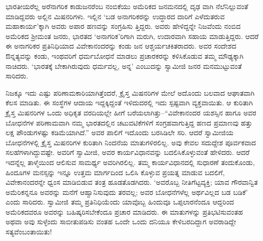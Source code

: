 ಭಾರತೀಯರೆಲ್ಲ ಅರೆನಾಗರಿಕ ಕಾಡುಜನರೆಂಬ ನಂಬಿಕೆಯು ಅಮೆರಿಕದ ಜನಮನದಲ್ಲಿ ದೃಢ ವಾಗಿ ನೆಲೆನಿಲ್ಲುವಂತೆ ಮಾಡಿದ್ದವರು ಅಲ್ಲಿನ ಮಿಷನರಿಗಳು. ಇಲ್ಲಿನ ‘ಬಡ ಅನಾಗರಿಕರನ್ನು ಉದ್ಧಾರದ ದಾರಿಗೆ ಎಳೆದುತರುವ ಮಹಾಕಾರ್ಯ’ಕ್ಕಾಗಿ ಅವರು ಅಪಾರ ಹಣವನ್ನು ಸಂಗ್ರಹಿಸು ತ್ತಿದ್ದರು. ಅವರು ಹೇಳಿದ್ದನ್ನೇ ನಿಜವೆಂದು ನಂಬಿದ ಅಮೆರಿಕದ ಶ್ರೀಮಂತ ಜನರು, ಭಾರತದ ‘ಅನಾಗರಿಕ’ರಿಗಾಗಿ ಮರುಗಿ, ಉದಾರವಾಗಿ ಸಹಾಯ ಮಾಡುತ್ತಿದ್ದರು. ಆದರೆ ಈ ಅನಾಗರಿಕರ ಪ್ರತಿನಿಧಿಯಾದ ವಿವೇಕಾನಂದರನ್ನು ಕಂಡು ಜನ ಆಶ್ಚರ್ಯಚಕಿತರಾದರು. ಅವರ ಸಂದೇಶದ ಔನ್ನತ್ಯವನ್ನು ಕಂಡು, ಇಂಥವರಿಗೆ ಧರ್ಮಬೋಧನೆ ಮಾಡಲು ಪ್ರಚಾರಕರನ್ನು ಕಳಿಸಿಕೊಡುವ ತಮ್ಮ ಮೌಢ್ಯಕ್ಕಾಗಿ ನಾಚಿದರು. ‘ಭಾರತಕ್ಕೆ ಬೇಕಾಗಿರುವುದು ಧರ್ಮವಲ್ಲ, ಅನ್ನ’ ಎಂಬುದನ್ನು ಸ್ವಾಮೀಜಿ ಜನರ ಮನಮುಟ್ಟುವಂತೆ ಸಾರಿದರು.

ನಿಜಕ್ಕೂ ಇದು ಎಷ್ಟು ಪರಿಣಾಮಕಾರಿಯಾಗಿತ್ತೆಂದರೆ, ಕ್ರೈಸ್ತ ಮಿಷನರಿಗಳ ಮೇಲೆ ಅದೊಂದು ಬಲವಾದ ಆಘಾತವಾಗಿ ಕೆಲಸ ಮಾಡಿತು. ಈ ಸಂಸ್ಥೆಗಳ ಆದಾಯ ಇದ್ದಕ್ಕಿದ್ದಂತೆ ಇಳಿದುದರಲ್ಲಿ ಇದು ಸ್ಪಷ್ಟವಾಗಿ ವ್ಯಕ್ತವಾಯಿತು. ಆ ಕುರಿತಾಗಿ ಕ್ರೈಸ್ತ ಮಿಷನರಿಗಳ ಒಂದು ಅಧಿಕೃತ ವರದಿಯಲ್ಲೇ ಹೀಗೆ ಬರೆಯಲಾಗಿತ್ತು–“ವಿವೇಕಾನಂದರ ಯಶಸ್ಸಿನ ಹಾಗೂ ಅವರ ಬೋಧನೆಗಳ ಪರಿಣಾಮವಾಗಿ ನಮ್ಮ ಭಾರತದಲ್ಲಿನ ಚಟುವಟಿಕೆಗಳಿಗೆ ಸಂಗ್ರಹವಾಗುತ್ತಿದ್ದ ಹಣದ ಪ್ರಮಾಣವು ಹತ್ತು ಲಕ್ಷ ಪೌಂಡುಗಳಷ್ಟು ಕಡಿಮೆಯಾಗಿದೆ.” ಅವರ ಪಾಲಿಗೆ ಇದೊಂದು ಬರಸಿಡಿಲೇ ಸರಿ. ಆದರೆ ಸ್ವಾಮೀಜಿಯ ಬೋಧನೆಗಳಲ್ಲಿ ಕ್ರೈಸ್ತ ಮಿಷನರಿಗಳ ಕುರಿತಾಗಿ ನಿಂದನೆಯ ಮಾತುಗಳಿರಲಿಲ್ಲ. ಅವು ಕೇವಲ ಸದುದ್ದೇಶ ಪೂರ್ವಕವಾದ ಸಲಹೆಗಳಾಗಿದ್ದುವಷ್ಟೇ. ಅವರಿಗೆ ಸ್ವಾಮೀಜಿ, ಅವರ ಕಾರ್ಯವಿಧಾನವನ್ನು ಬದಲಿಸಿಕೊಳ್ಳುವಂತೆ ಹೇಳಿದರು. ಆದರೆ ಇದನ್ನೆಲ್ಲ ತಾಳ್ಮೆಯಿಂದ ಆಲಿಸುವ ಸಾಮರ್ಥ್ಯ ಅವರಿಗಿರಲಿಲ್ಲ. ತಮ್ಮ ಕಾರ್ಯವಿಧಾನದಲ್ಲಿ ಸುಧಾರಣೆ ತಂದುಕೊಂಡು, ಹಿಂದೂಗಳ ಮನಸ್ಸನ್ನು ಇನ್ನೂ ಉತ್ತಮ ಮಾರ್ಗದಿಂದ ಒಲಿಸಿ ಕೊಳ್ಳುವ ಪ್ರಯತ್ನ ಮಾಡುವ ಬದಲಿಗೆ, ವಿವೇಕಾನಂದರನ್ನೇ ಧ್ವಂಸ ಮಾಡಿಬಿಡುವ ತಂತ್ರ ಹೂಡತೊಡಗಿದರು. ‘ಅವರೊಬ್ಬ ನೀತಿಗೆಟ್ಟವ್ಯಕ್ತಿ; ಯಾವ ಗೌರವಾನ್ವಿತ ಅಮೆರಿಕನ್ನನೂ ಅವರನ್ನು ಮನೆಗೆ ಆಹ್ವಾನಿಸುವುದು ತರವಲ್ಲ; ಅವರ ಬೋಧನೆಗಳೆಲ್ಲ ಅರ್ಥವಿಲ್ಲದ ಬಡ ಬಡಿಕೆ’ ಎಂದು ಸಾರಿದರು. ಸ್ವಾಮೀಜಿ ತಮ್ಮ ಪ್ರತಿನಿಧಿಯೆಂದು ಯಾವೊಬ್ಬ ಹಿಂದುವೂ ಒಪ್ಪಲಾರನೆಂದೂ ಆದ್ದರಿಂದ ಅಮೆರಿಕದವರೂ ಅವರನ್ನು ಬಹಿಷ್ಕರಿಸಬೇಕೆಂದೂ ಪ್ರಚಾರ ಮಾಡಿದರು. ಈ ಮಾತುಗಳನ್ನು ಪ್ರತಿಭಟಿಸುವಂತಹ ಅಥವಾ ಅವು ಸುಳ್ಳೆಂದು ಸಾಬೀತುಪಡಿಸು ವಂತಹ ಒಂದೇ ಒಂದು ದನಿಯೂ ಕೇಳಿಬರದಿದ್ದಾಗ ಅವರಾಡಿದ್ದೇ ಸತ್ಯವೆಂಬಂತಾಯಿತು!

